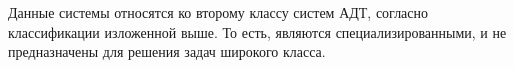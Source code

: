 Данные системы относятся ко второму классу систем АДТ, согласно классификации изложенной выше. То есть, являются специализированными, и не предназначены для решения задач широкого класса.












